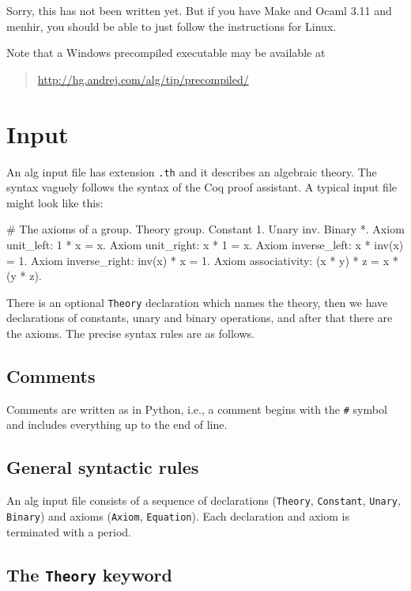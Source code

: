 \documentclass{report}
\begin{document}
Sorry, this has not been written yet. But if you have Make and Ocaml
3.11 and menhir, you should be able to just follow the instructions
for Linux.

Note that a Windows precompiled executable may be available at
%
\begin{quote}
  \url{http://hg.andrej.com/alg/tip/precompiled/}
\end{quote}

\chapter{Input}
\label{sec:input}

An alg input file has extension \texttt{.th} and it describes an
algebraic theory. The syntax vaguely follows the syntax of the Coq
proof assistant. A typical input file might look like this:
%
\begin{alg}
# The axioms of a group.
Theory group.
Constant 1.
Unary inv.
Binary *.
Axiom unit_left: 1 * x = x.
Axiom unit_right: x * 1 = x.
Axiom inverse_left: x * inv(x) = 1.
Axiom inverse_right: inv(x) * x = 1.
Axiom associativity: (x * y) * z = x * (y * z).
\end{alg}
%
There is an optional \texttt{Theory} declaration which names the
theory, then we have declarations of constants, unary and binary
operations, and after that there are the axioms. The precise
syntax rules are as follows.

\section{Comments}

Comments are written as in Python, i.e., a comment begins with the
\texttt{\#} symbol and includes everything up to the end of line.

\section{General syntactic rules}

An alg input file consists of a sequence of declarations
(\texttt{Theory}, \texttt{Constant}, \texttt{Unary}, \texttt{Binary})
and axioms (\texttt{Axiom}, \texttt{Equation}). Each declaration and
axiom is terminated with a period.

\section{The \texttt{Theory} keyword}
\end{document}
